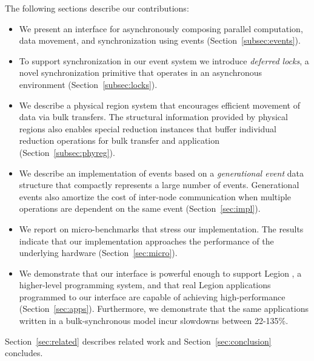 The following sections describe our contributions:
\begin{itemize} \itemsep1pt \parskip0pt 
\item We present an interface for asynchronously composing
parallel computation, data movement, and synchronization using events (Section~\ref{subsec:events}).  

\item To support synchronization in our event system we introduce {\em deferred locks}, 
a novel synchronization primitive that operates in an asynchronous environment (Section~\ref{subsec:locks}).

\item We describe a physical region system that encourages efficient movement of data
via bulk transfers.  The structural information provided by physical regions also enables
special reduction instances that buffer individual reduction operations for bulk
transfer and application (Section~\ref{subsec:phyreg}).

\item We describe an implementation of events based on a {\em generational event}
data structure that compactly represents a large number of events.  Generational
events also amortize the cost of inter-node communication when multiple operations are dependent
on the same event (Section~\ref{sec:impl}).

\item We report on micro-benchmarks that stress
our implementation.  The results indicate that our implementation approaches the performance of
the underlying hardware (Section~\ref{sec:micro}).

\item We demonstrate that our interface is powerful enough to support Legion \cite{Legion12}, a higher-level
programming system, and that real Legion applications programmed to our interface
are capable of achieving high-performance (Section~\ref{sec:apps}).  Furthermore, we demonstrate
that the same applications written in a bulk-synchronous model incur slowdowns between 22-135\%.
\end{itemize}

Section~\ref{sec:related} describes related work and Section~\ref{sec:conclusion}
concludes.

